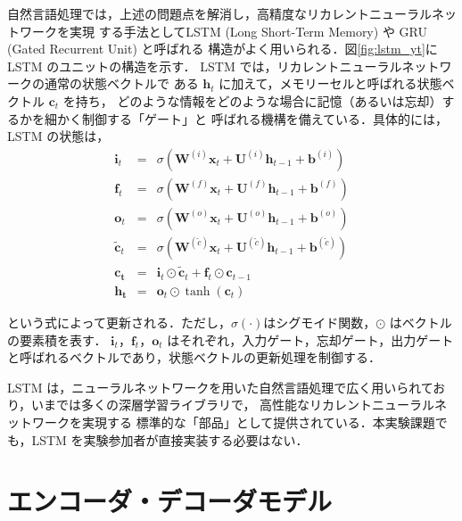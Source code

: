 自然言語処理では，上述の問題点を解消し，高精度なリカレントニューラルネットワークを実現
する手法としてLSTM (Long Short-Term Memory) \cite{hochreiter1997long} や 
GRU (Gated Recurrent Unit) \cite{chung2014empirical} と呼ばれる
構造がよく用いられる．図\ref{fig:lstm_yt}に LSTM のユニットの構造を示す．
LSTM では，リカレントニューラルネットワークの通常の状態ベクトルで
ある $\boldsymbol{h}_{t}$ に加えて，メモリーセルと呼ばれる状態ベクトル $\boldsymbol{c}_{t}$ を持ち，
どのような情報をどのような場合に記憶（あるいは忘却）するかを細かく制御する「ゲート」と
呼ばれる機構を備えている．具体的には，LSTM の状態は，
\begin{eqnarray}
\boldsymbol{i}_t &=& \sigma(\boldsymbol{W}^{(i)} \boldsymbol{x}_t + \boldsymbol{U}^{(i)} \boldsymbol{h}_{t-1} + \boldsymbol{b}^{(i)})\\
\boldsymbol{f}_t &=& \sigma(\boldsymbol{W}^{(f)} \boldsymbol{x}_t + \boldsymbol{U}^{(f)} \boldsymbol{h}_{t-1} + \boldsymbol{b}^{(f)})\\
\boldsymbol{o}_t &=& \sigma(\boldsymbol{W}^{(o)} \boldsymbol{x}_t + \boldsymbol{U}^{(o)} \boldsymbol{h}_{t-1} + \boldsymbol{b}^{(o)})\\
\boldsymbol{\tilde{c}}_t &=& \sigma(\boldsymbol{W}^{(\tilde{c})} \boldsymbol{x}_t + \boldsymbol{U}^{(\tilde{c})} \boldsymbol{h}_{t-1} + \boldsymbol{b}^{(\tilde{c})})\\
\boldsymbol{c_t} &=& \boldsymbol{i}_t \odot \boldsymbol{\tilde{c}}_t + \boldsymbol{f}_t \odot \boldsymbol{c}_{t-1} \\
\boldsymbol{h_t} &=& \boldsymbol{o}_t \odot \tanh(\boldsymbol{c}_t)
\end{eqnarray}

\noindent
という式によって更新される．ただし，$\sigma(\cdot)$はシグモイド関数，$\odot$ はベクトルの要素積を表す．
$\boldsymbol{i}_t$，$\boldsymbol{f}_t$，$\boldsymbol{o}_t$ はそれぞれ，入力ゲート，忘却ゲート，出力ゲート
と呼ばれるベクトルであり，状態ベクトルの更新処理を制御する．

LSTM は，ニューラルネットワークを用いた自然言語処理で広く用いられており，いまでは多くの深層学習ライブラリで，
高性能なリカレントニューラルネットワークを実現する
標準的な「部品」として提供されている．本実験課題でも，LSTM を実験参加者が直接実装する必要はない．




\section{エンコーダ・デコーダモデル}

